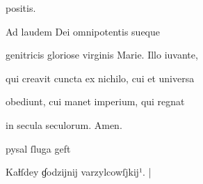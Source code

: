 positis.	

Ad laudem Dei omnipotentis sueque 

genitricis gloriose virginis Marie. Illo iuvante,

qui creavit cuncta ex nichilo, cui et universa 

obediunt, cui manet imperium, qui regnat 

in secula seculorum. Amen.


pysal ſluga geft

Kaƚſdey ɠodzĳnĳ varzylcowſjkĳ¹. |






\endinput




















\catcode `\^^M=5

  \newtip{48}{Łoś niesłusznie uważa, że \textit{bika} w obu wypadkach
    napisano błędnie zamiast \textit{ƀyka}. Przykłady są bowiem podane
    w~pisowni dotychczasowej dla pokazania jej niewystarczalności do
    zróżnicowania wyrazów \textit{bika} i \textit{byka}.} 

\obeylines






\newcommand{\margin}[1]{\annotatetextBlue{\{#1\}}{zapisy na marginesie}}



\renewcommand{\over}[1]{\annotatetextBlue{\{#1\}}{zapisy nad rządkami}}

\newcommand{\add}[1]{\annotatetextOlive{<#1>}{litery i wyrazy dodane, (których w tekście brak)}}

\newcommand{\extra}[1]{\colorbox{magenta!10}{[#1]}}

